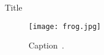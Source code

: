 \begin{refsection}
\begin{frame}{Title}
  \centering

  \begin{figure}
    \centering
    \texttt{[image: frog.jpg]}
    \caption{\scriptsize Caption~\parencite{greenwade93}.}
  \end{figure}

  \bottomleftrefs
\end{frame}
\end{refsection}
